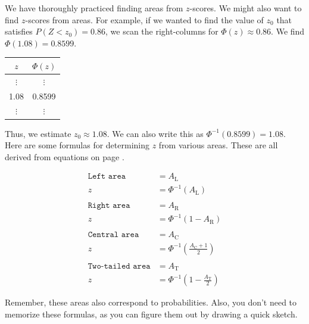 \documentclass[12pt,letterpaper]{article}
\begin{document}
\newpage
We have thoroughly practiced finding areas from $z$-scores. We might also want to find $z$-scores from areas. For example, if we wanted to find the value of $z_0$ that satisfies $P(Z<z_0) = 0.86$, we scan the right-columns for $\Phi(z)\approx 0.86$. We find $\Phi(1.08) = 0.8599$.
\begin{center}
\begin{tabular}{|c|c|}\hline
$z$ & $\Phi(z)$ \\ \hline
$\vdots$ & $\vdots$ \\
1.08 & 0.8599 \\
$\vdots$ & $\vdots$ \\ \hline
\end{tabular}
\end{center}
Thus, we estimate $z_0\approx 1.08$. We can also write this as $\Phi^{-1}(0.8599)=1.08$. Here are some formulas for determining $z$ from various areas. These are all derived from equations on page \pageref{hi}.

\begin{align*}
\texttt{Left area} &= A_\text{L}\\
z &= \Phi^{-1}(A_\text{L})\\\\
\texttt{Right area} &= A_\text{R} \\
z &= \Phi^{-1}(1-A_\text{R})\\\\
\texttt{Central area} &= A_\text{C}\\
z &= \Phi^{-1}\left(\frac{A_\text{C}+1}{2}\right)\\\\
\texttt{Two-tailed area} &= A_\text{T} \\
z &= \Phi^{-1}\left(1-\frac{A_\text{T}}{2}\right)
\end{align*}

Remember, these areas also correspond to probabilities. Also, you don't need to memorize these formulas, as you can figure them out by drawing a quick sketch.
\end{document}
